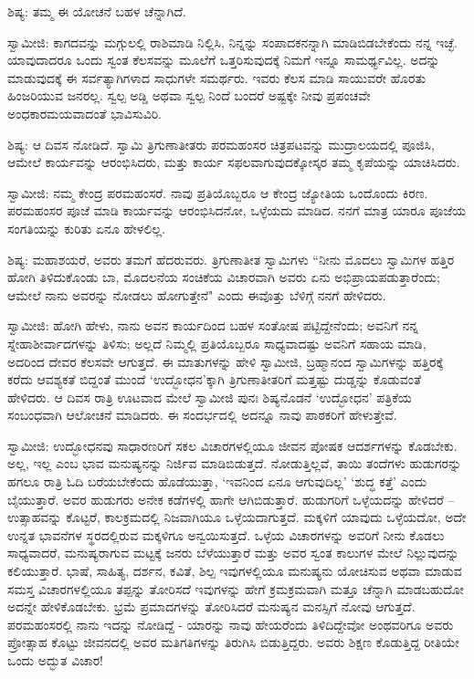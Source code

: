 ಶಿಷ್ಯ: ತಮ್ಮ ಈ ಯೋಚನೆ ಬಹಳ ಚೆನ್ನಾಗಿದೆ.

ಸ್ವಾಮೀಜಿ: ಕಾಗದವನ್ನು ಮಗ್ಗುಲಲ್ಲಿ ರಾಶಿಮಾಡಿ ನಿಲ್ಲಿಸಿ, ನಿನ್ನನ್ನು ಸಂಪಾದಕನನ್ನಾಗಿ ಮಾಡಿಬಿಡಬೇಕೆಂದು ನನ್ನ ಇಚ್ಛೆ. ಯಾವುದಾದರೂ ಒಂದು ಸ್ವಂತ ಕೆಲಸವನ್ನು ಮೂಲೆಗೆ ಒತ್ತರಿಸುವುದಕ್ಕೆ ನಿಮಗೆ ಇನ್ನೂ ಸಾಮರ್ಥ್ಯವಿಲ್ಲ. ಅದನ್ನು ಮಾಡುವುದಕ್ಕೆ ಈ ಸರ್ವತ್ಯಾಗಿಗಳಾದ ಸಾಧುಗಳೇ ಸಮರ್ಥರು. ಇವರು ಕೆಲಸ ಮಾಡಿ ಸಾಯುವರೇ ಹೊರತು ಹಿಂಜರಿಯುವ ಜನರಲ್ಲ. ಸ್ವಲ್ಪ ಅಡ್ಡಿ ಅಥವಾ ಸ್ವಲ್ಪ ನಿಂದೆ ಬಂದರೆ ಅಷ್ಟಕ್ಕೇ ನೀವು ಪ್ರಪಂಚವೇ ಅಂಧಕಾರಮಯವಾದಂತೆ ಭಾವಿಸುವಿರಿ.

ಶಿಷ್ಯ: ಆ ದಿವಸ ನೋಡಿದೆ. ಸ್ವಾಮಿ ತ್ರಿಗುಣಾತೀತರು ಪರಮಹಂಸರ ಚಿತ್ರಪಟವನ್ನು ಮುದ್ರಾಲಯದಲ್ಲಿ ಪೂಜಿಸಿ, ಆಮೇಲೆ ಕಾರ್ಯವನ್ನು ಆರಂಭಿಸಿದರು, ಮತ್ತು ಕಾರ್ಯ ಸಫಲವಾಗುವುದಕ್ಕೋಸ್ಕರ ತಮ್ಮ ಕೃಪೆಯನ್ನು ಯಾಚಿಸಿದರು.

ಸ್ವಾಮೀಜಿ: ನಮ್ಮ ಕೇಂದ್ರ ಪರಮಹಂಸರೆ. ನಾವು ಪ್ರತಿಯೊಬ್ಬರೂ ಆ ಕೇಂದ್ರ ಜ್ಯೋತಿಯ ಒಂದೊಂದು ಕಿರಣ. ಪರಮಹಂಸರ ಪೂಜೆ ಮಾಡಿ ಕಾರ್ಯವನ್ನು ಆರಂಭಿಸಿದನೋ, ಒಳ್ಳೆಯದು ಮಾಡಿದ. ನನಗೆ ಮಾತ್ರ ಯಾರೂ ಪೂಜೆಯ ಸಂಗತಿಯನ್ನು ಕುರಿತು ಏನೂ ಹೇಳಲಿಲ್ಲ.

ಶಿಷ್ಯ: ಮಹಾಶಯರೆ, ಅವರು ತಮಗೆ ಹೆದರುವರು. ತ್ರಿಗುಣಾತೀತ ಸ್ವಾಮಿಗಳು “ನೀನು ಮೊದಲು ಸ್ವಾಮಿಗಳ ಹತ್ತಿರ ಹೋಗಿ ತಿಳಿದುಕೊಂಡು ಬಾ, ಮೊದಲನೆಯ ಸಂಚಿಕೆಯ ವಿಚಾರವಾಗಿ ಅವರು ಏನು ಅಭಿಪ್ರಾಯಪಡುತ್ತಾರೆಂದು; ಆಮೇಲೆ ನಾನು ಅವರನ್ನು ನೋಡಲು ಹೋಗುತ್ತೇನೆ" ಎಂದು ಈವೊತ್ತು ಬೆಳಿಗ್ಗೆ ನನಗೆ ಹೇಳಿದರು.

ಸ್ವಾಮೀಜಿ: ಹೋಗಿ ಹೇಳು, ನಾನು ಅವನ ಕಾರ್ಯದಿಂದ ಬಹಳ ಸಂತೋಷ ಪಟ್ಟಿದ್ದೇನೆಂದು; ಅವನಿಗೆ ನನ್ನ ಸ್ನೇಹಾಶೀರ್ವಾದಗಳನ್ನು ತಿಳಿಸು; ಅಲ್ಲದೆ ನಿಮ್ಮಲ್ಲಿ ಪ್ರತಿಯೊಬ್ಬರೂ ಸಾಧ್ಯವಾದಷ್ಟು ಅವನಿಗೆ ಸಹಾಯ ಮಾಡಿ, ಅದರಿಂದ ದೇವರ ಕೆಲಸವೇ ಆಗುತ್ತದೆ. ಈ ಮಾತುಗಳನ್ನು ಹೇಳಿ ಸ್ವಾಮೀಜಿ, ಬ್ರಹ್ಮಾನಂದ ಸ್ವಾಮಿಗಳನ್ನು ಹತ್ತಿರಕ್ಕೆ ಕರೆದು ಆವಶ್ಯಕತೆ ಬಿದ್ದಂತೆ ಮುಂದೆ ‘ಉದ್ಭೋಧನ’ಕ್ಕಾಗಿ ತ್ರಿಗುಣಾತೀತರಿಗೆ ಮತ್ತಷ್ಟು ದುಡ್ಡನ್ನು ಕೊಡುವಂತೆ ಹೇಳಿದರು. ಆ ದಿವಸ ರಾತ್ರಿ ಊಟವಾದ ಮೇಲೆ ಸ್ವಾಮೀಜಿ ಪುನಃ ಶಿಷ್ಯನೊಡನೆ ‘ಉದ್ಭೋಧನ’ ಪತ್ರಿಕೆಯ ಸಂಬಂಧವಾಗಿ ಆಲೋಚನೆ ಮಾಡಿದರು. ಈ ಸಂದರ್ಭದಲ್ಲಿ ಅದನ್ನೂ ನಾವು ಪಾಠಕರಿಗೆ ಹೇಳುತ್ತೇವೆ.

ಸ್ವಾಮೀಜಿ: ಉದ್ಭೋಧನವು ಸಾಧಾರಣರಿಗೆ ಸಕಲ ವಿಚಾರಗಳಲ್ಲಿಯೂ ಜೀವನ ಪೋಷಕ ಆದರ್ಶಗಳನ್ನು ಕೊಡಬೇಕು. ಅಲ್ಲ, ಇಲ್ಲ ಎಂಬ ಭಾವ ಮನುಷ್ಯನನ್ನು ನಿರ್ಜಿವ ಮಾಡಿಬಿಡುತ್ತದೆ. ನೋಡುತ್ತಿಲ್ಲವೆ, ತಾಯಿ ತಂದೆಗಳು ಹುಡುಗರನ್ನು ಹಗಲೂ ರಾತ್ರಿ ಓದಿ ಬರೆಯಬೇಕೆಂದು ಹೊಡೆಯುತ್ತಾ, ‘ಇವನಿಂದ ಏನೂ ಆಗುವುದಿಲ್ಲ’ ‘ಶುದ್ಧ ಕತ್ತೆ’ ಎಂದು ಬೈಯುತ್ತಾರೆ. ಅವರ ಹುಡುಗರು ಅನೇಕ ಕಡೆಗಳಲ್ಲಿ ಹಾಗೇ ಆಗಿಬಿಡುತ್ತಾರೆ. ಹುಡುಗರಿಗೆ ಒಳ್ಳೆಯದನ್ನು ಹೇಳಿದರೆ – ಉತ್ಸಾಹವನ್ನು ಕೊಟ್ಟರೆ, ಕಾಲಕ್ರಮದಲ್ಲಿ ನಿಜವಾಗಿಯೂ ಒಳ್ಳೆಯದಾಗುತ್ತದೆ. ಮಕ್ಕಳಿಗೆ ಯಾವುದು ಒಳ್ಳೆಯದೋ, ಅದೇ ಉನ್ನತ ಭಾವನೆಗಳ ಸ್ಥರದಲ್ಲಿರುವ ಮಕ್ಕಳಿಗೂ ಅನ್ವಯಿಸುತ್ತದೆ. ಒಳ್ಳೆಯ ವಿಚಾರಗಳನ್ನು ಅವರಿಗೆ ನೀನು ಕೊಡಲು ಸಾಧ್ಯವಾದರೆ, ಮನುಷ್ಯರಾಗುವ ಮಟ್ಟಕ್ಕೆ ಜನರು ಬೆಳೆಯುತ್ತಾರೆ ಮತ್ತು ಅವರ ಸ್ವಂತ ಕಾಲುಗಳ ಮೇಲೆ ನಿಲ್ಲುವುದನ್ನು ಕಲಿಯುತ್ತಾರೆ. ಭಾಷೆ, ಸಾಹಿತ್ಯ, ದರ್ಶನ, ಕವಿತೆ, ಶಿಲ್ಪ ಇವುಗಳಲ್ಲಿಯೂ ಮನುಷ್ಯನು ಯೋಚಿಸುವ ಅಥವಾ ಮಾಡುವ ಸಮಸ್ತ ವಿಚಾರಗಳಲ್ಲಿಯೂ ತಪ್ಪನ್ನು ತೋರಿಸದೆ ಇವುಗಳನ್ನು ಹೇಗೆ ಕ್ರಮಕ್ರಮವಾಗಿ ಮತ್ತೂ ಚೆನ್ನಾಗಿ ಮಾಡಬಹುದೋ ಅದನ್ನೇ ಹೇಳಿಕೊಡಬೇಕು. ಭ್ರಮೆ ಪ್ರಮಾದಗಳನ್ನು ತೋರಿಸಿದರೆ ಮನುಷ್ಯನ ಮನಸ್ಸಿಗೆ ನೋವು ಆಗುತ್ತದೆ. ಪರಮಹಂಸರಲ್ಲಿ ನಾನು ಇದನ್ನು ನೋಡಿದ್ದೆ - ಯಾರನ್ನು ನಾವು ಹೇಯರೆಂದು ತಿಳಿದಿದ್ದೇವೋ ಅಂಥವರಿಗೂ ಅವರು ಪ್ರೋತ್ಸಾಹ ಕೊಟ್ಟು ಜೀವನದಲ್ಲಿ ಅವರ ಮತಿಗತಿಗಳನ್ನು ತಿರುಗಿಸಿ ಬಿಡುತ್ತಿದ್ದರು. ಅವರು ಶಿಕ್ಷಣ ಕೊಡುತ್ತಿದ್ದ ರೀತಿಯೇ ಒಂದು ಅದ್ಭುತ ವಿಚಾರ!

